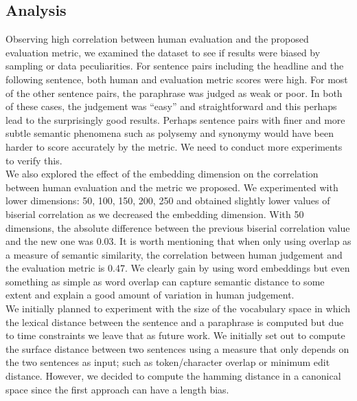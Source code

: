 \documentclass[11pt,letterpaper]{article}
\begin{document}
\subsection{Analysis}
Observing high correlation between human evaluation and the proposed evaluation metric, we examined the dataset to see if results were biased by sampling or data peculiarities. For sentence pairs including the headline and the following sentence, both human and evaluation metric scores were high. For most of the other sentence pairs, the paraphrase was judged as weak or poor. In both of these cases, the judgement was ``easy'' and straightforward and this perhaps lead to the surprisingly good results. Perhaps sentence pairs with finer and more subtle semantic phenomena such as polysemy and synonymy would have been harder to score accurately by the metric.  We need to conduct more experiments to verify this.\\ 
We also explored the effect of the embedding dimension on the correlation between human evaluation and the metric we proposed. We experimented with lower dimensions: 50, 100, 150, 200, 250 and obtained slightly lower values of biserial correlation as we decreased the embedding dimension. With 50 dimensions, the absolute difference between the previous biserial correlation value and the new one was 0.03. It is worth mentioning that when only using overlap as a measure of semantic similarity, the correlation between human judgement and the evaluation metric is 0.47. We clearly gain by using word embeddings but even something as simple as word overlap can capture semantic distance to some extent and explain a good amount of variation in human judgement.\\ 
\noindent We initially planned to experiment with the size of the vocabulary space in which the lexical distance between the sentence and a paraphrase is computed but due to time constraints we leave that as future work. We initially set out to compute the surface distance between two sentences using a measure that only depends on the two sentences as input; such as token/character overlap or minimum edit distance. However, we decided to compute the hamming distance in a canonical space since the first approach can have a length bias.\\ 
\end{document}
